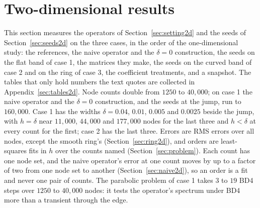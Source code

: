 \documentclass[11pt]{amsart}
\theoremstyle{definition}
\theoremstyle{remark}
\begin{document}
\section{Two-dimensional results}
\label{sec:results2d}
This section measures the operators of Section~\ref{sec:setting2d} and the
seeds of Section~\ref{sec:seeds2d} on the three cases, in the order of the
one-dimensional study: the references, the naive operator and the
$\delta = 0$ construction, the seeds on the flat band of case 1, the
matrices they make, the seeds on the curved band of case 2 and on the ring
of case 3, the coefficient treatments, and a snapshot. The tables that only
hold numbers the text quotes are collected in
Appendix~\ref{sec:tables2d}. Node counts double from $1250$
to $40{,}000$; on case 1 the naive operator and the $\delta = 0$ construction, and the
seeds at the jump, run to $160{,}000$. Case 1 has the widths
$\delta = 0.04$, $0.01$, $0.005$ and $0.0025$ beside the jump, with
$h = \delta$ near $11{,}000$, $44{,}000$ and $177{,}000$ nodes for the last
three and $h < \delta$ at every count for the first; case 2 has the last
three. Errors are RMS errors over all nodes, except the smooth ring's
(Section~\ref{sec:ring2d}), and orders are least-squares
fits in $h$ over the counts named (Section~\ref{sec:problem}). Each count has
one node set, and the naive operator's error at one count moves by up to a
factor of two from one node set to another (Section~\ref{sec:naive2d}), so
an order is a fit and never one pair of counts. The parabolic problem of
case 1 takes $3$ to $19$ BD4 steps over $1250$ to $40{,}000$ nodes: it tests
the operator's spectrum under BD4 more than a transient through the edge.
\end{document}
